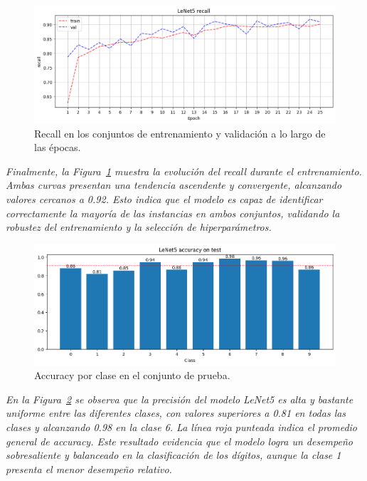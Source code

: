 \documentclass[conference]{IEEEtran}
\begin{document}
\begin{figure}[H]
    \centering
    \includegraphics[width=0.95\linewidth]{graphics-bilateral/bilateral-recall-train_val.png}
    \caption{Recall en los conjuntos de entrenamiento y validación a lo largo de las épocas.}
    \label{fig:bilateral-recall-train_val}
\end{figure}
\noindent\textit{
Finalmente, la Figura~\ref{fig:bilateral-recall-train_val} muestra la evolución del recall durante el entrenamiento. Ambas curvas presentan una tendencia ascendente y convergente, alcanzando valores cercanos a 0.92. Esto indica que el modelo es capaz de identificar correctamente la mayoría de las instancias en ambos conjuntos, validando la robustez del entrenamiento y la selección de hiperparámetros.
}


\begin{figure}[H]
    \centering
    \includegraphics[width=0.95\linewidth]{graphics-bilateral/bilateral-accuracy-test.png}
    \caption{Accuracy por clase en el conjunto de prueba.}
    \label{fig:bilateral-accuracy-test}
\end{figure}
\noindent\textit{
En la Figura~\ref{fig:bilateral-accuracy-test} se observa que la precisión del modelo LeNet5 es alta y bastante uniforme entre las diferentes clases, con valores superiores a 0.81 en todas las clases y alcanzando 0.98 en la clase 6. La línea roja punteada indica el promedio general de accuracy. Este resultado evidencia que el modelo logra un desempeño sobresaliente y balanceado en la clasificación de los dígitos, aunque la clase 1 presenta el menor desempeño relativo.
}
\end{document}
